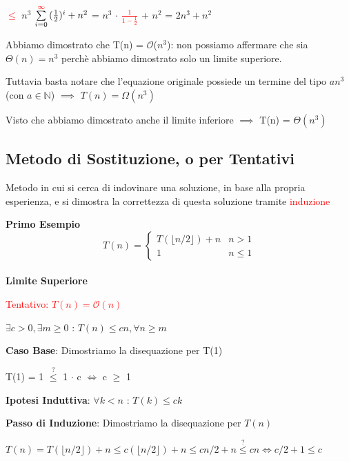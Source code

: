 \documentclass[../cheatSheetAlgoritmi.tex]{subfiles}
\begin{document}
\bigskip

\textcolor{red}{$\leq$} $n^{3}$ $\sum\limits_{i=0}^{\textcolor{red}{\infty}} {(\frac{1}{2})^{i}} + n^{2}$ =
$n^{3}$ $\cdot$ \textcolor{red}{$\frac{1}{1-\frac{1}{2}}$} + $n^{2}$ = $2n^{3} + n^2$
\newpage
\begin{flushleft}
Abbiamo dimostrato che T(n) = $\mathcal{O}$($n^{3}$): non possiamo affermare che sia $\Theta(n) = n^{3}$ perchè abbiamo dimostrato solo un limite superiore.
\end{flushleft}
Tuttavia basta notare che l'equazione originale possiede un termine del tipo $an^{3}$ (con $a \in \mathbb{N}$) $\implies$ $T(n) = \Omega(n^{3})$

Visto che abbiamo dimostrato anche il limite inferiore $\implies$ T(n) = $\Theta(n^{3})$ 
\subsection{Metodo di Sostituzione, o per Tentativi}
Metodo in cui si cerca di indovinare una soluzione, in base alla propria esperienza, e si dimostra la correttezza di questa soluzione tramite \textcolor{red}{induzione}

\bigskip

\textbf{Primo Esempio}
	\begin{equation*}
  		T(n)=\begin{cases}
    		T(\lfloor n/2 \rfloor) + n & \text{$n > 1$}\\
    		1 & \text{$n \leq 1$}
  		\end{cases}
	\end{equation*}
\hfill\\
\textbf{Limite Superiore}

\textcolor{red}{Tentativo: $T(n) = \mathcal{O}(n)$}

$\exists c > 0, \exists m \geq 0$ : $T(n) \leq cn, \forall n \geq m$

\bigskip

\textbf{Caso Base}: Dimostriamo la disequazione per T(1)

T(1) = 1 $\stackrel{?}{\leq}$ 1 $\cdot$ c $\iff$ c $\geq$ 1

\bigskip

\textbf{Ipotesi Induttiva}: $\forall k < n$ : $T(k) \leq ck$

\textbf{Passo di Induzione}: Dimostriamo la disequazione per $T(n)$

$T(n) =  T(\lfloor n/2 \rfloor) + n \leq c( \lfloor n/2 \rfloor) + n \leq cn/2 + n \stackrel{?}{\leq} cn \iff  c/2 + 1 \leq c$
\end{document}
